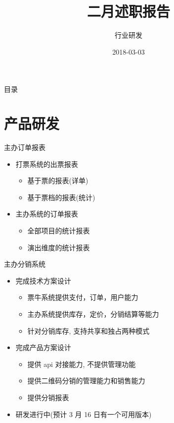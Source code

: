 \documentclass[presentation, bigger]{beamer}
\author{行业研发}
\date{2018-03-03}
\title{二月述职报告}
\begin{document}
\maketitle
\begin{frame}{目录}
\tableofcontents
\end{frame}


\section{产品研发}
\label{sec:orgfb35fb9}
\begin{frame}[label={sec:orgb81fa7f}]{主办订单报表}
\begin{itemize}
\item 打票系统的出票报表
\begin{itemize}
\item 基于票的报表(详单)
\item 基于票档的报表(统计)
\end{itemize}
\item 主办系统的订单报表
\begin{itemize}
\item 全部项目的统计报表
\item 演出维度的统计报表
\end{itemize}
\end{itemize}
\end{frame}

\begin{frame}[label={sec:org37bc7b4}]{主办分销系统}
\begin{itemize}
\item 完成技术方案设计
\begin{itemize}
\item 票牛系统提供支付，订单，用户能力
\item 主办系统提供库存，定价，分销结算等能力
\item 针对分销库存, 支持共享和独占两种模式
\end{itemize}
\item 完成产品方案设计
\begin{itemize}
\item 提供 api 对接能力, 不提供管理功能
\item 提供二维码分销的管理能力和销售能力
\item 提供分销报表
\end{itemize}
\item 研发进行中(预计 3 月 16 日有一个可用版本)
\end{itemize}
\end{frame}
\end{document}
